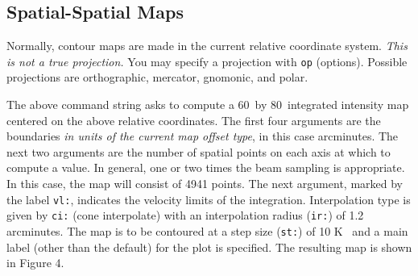 \subsection{Spatial-Spatial Maps}

Normally, contour maps are made in the current relative
coordinate system.  {\em This is not a true projection.}  You may specify a
projection with {\tt op} (options). Possible projections are orthographic,
mercator, gnomonic, and polar.

\smallskip
{}
\frenchspacing
{}
\nonfrenchspacing
\smallskip
{} 
\smallskip\noindent
The above command string asks \COMB to compute a 60\arcm\ by 80\arcm\ integrated 
intensity map centered on the above relative coordinates.  The first 
four arguments are the boundaries {\em in units of the current map offset type}, in 
this case arcminutes.
The next two arguments are the number of spatial points on each axis at
which to compute a value. In general, one or two times the beam sampling is 
appropriate. In this case, the map will consist of 4941 points. 
The next argument,
marked by the label {\tt vl:}, indicates the velocity limits of the integration.
Interpolation type is given by {\tt ci:} (cone interpolate) with an 
interpolation radius ({\tt ir:}) of 1.2 arcminutes. The map is to be contoured
at a step size ({\tt st:}) of 10 K \kms\ and a main label (other than the default) 
for the plot is specified. The resulting map is shown in Figure 4.
\smallskip
{}
\smallskip
 
